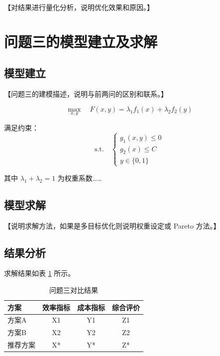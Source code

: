\documentclass[withoutpreface,bwprint]{cumcmthesis}
\begin{document}
【对结果进行量化分析，说明优化效果和原因。】

\section{问题三的模型建立及求解}

\subsection{模型建立}

【问题三的建模描述，说明与前两问的区别和联系。】

\begin{equation}
    \max_{x,y} \quad F(x,y) = \lambda_1 f_1(x) + \lambda_2 f_2(y)
    \label{eq:obj3}
\end{equation}

满足约束：
\begin{equation}
    \text{s.t.} \quad
    \begin{cases}
        g_1(x,y) \leq 0 \\
        g_2(x) \leq C   \\
        y \in \{0,1\}
    \end{cases}
    \label{eq:con3}
\end{equation}

其中 $\lambda_1 + \lambda_2 = 1$ 为权重系数……

\subsection{模型求解}

【说明求解方法，如果是多目标优化则说明权重设定或 Pareto 方法。】

\subsection{结果分析}

求解结果如表 \cref{tab:result3} 所示。

{\renewcommand{\arraystretch}{1.38}
\setlength{\tabcolsep}{6pt}
\begin{longtable}{lccc}
    \caption{问题三对比结果}\label{tab:result3}\\
    \toprule[1.5pt]
    方案   & 效率指标 & 成本指标 & 综合评价 \\
    \midrule[1pt]
    \endfirsthead
    \endhead
    \bottomrule[1.5pt]
    \endlastfoot
    方案A  & X1   & Y1   & Z1   \\
    方案B  & X2   & Y2   & Z2   \\
    推荐方案 & X*   & Y*   & Z*   \\
\end{longtable}}
\end{document}
